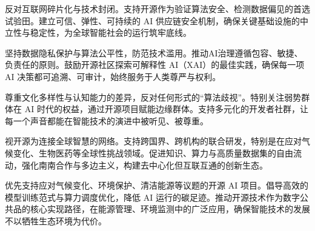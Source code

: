 
\par

反对互联网碎片化与技术封闭。支持开源作为验证算法安全、检测数据偏见的首选试验田。建立可信、弹性、可持续的 AI 供应链安全机制，确保关键基础设施的中立性与稳定性，为全球智能社会的运行筑牢底线。



\par

坚持数据隐私保护与算法公平性，防范技术滥用。推动AI治理遵循包容、敏捷、负责任的原则。鼓励开源社区探索可解释性 AI（XAI）的最佳实践，确保每一项 AI 决策都可追溯、可审计，始终服务于人类尊严与权利。


\par

尊重文化多样性与认知能力的差异，反对任何形式的“算法歧视”。特别关注弱势群体在 AI 时代的权益，通过开源项目赋能边缘群体。支持多元化的开发者社群，让每一个声音都能在智能技术的演进中被听见、被尊重。

\par

视开源为连接全球智慧的网络。支持跨国界、跨机构的联合研发，特别是在应对气候变化、生物医药等全球性挑战领域。促进知识、算力与高质量数据集的自由流动，强化南南合作与多边主义，构建去中心化但互联互通的创新生态。

\clearpage{}


\par

优先支持应对气候变化、环境保护、清洁能源等议题的开源 AI 项目。倡导高效的模型训练范式与算力调度优化，降低 AI 运行的碳足迹。推动开源技术作为数字公共品的核心实现路径，在能源管理、环境监测中的广泛应用，确保智能技术的发展不以牺牲生态环境为代价。


\par

